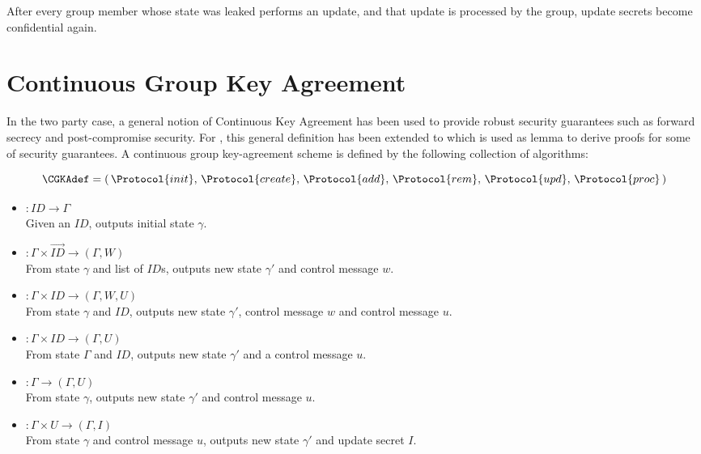\begin{definition}
After every group member whose state was leaked performs an update, and that update is processed by the group, update secrets become confidential again.
\end{definition}


\hypertarget{sec:CGKA}{%
\section{Continuous Group Key Agreement}\label{sec:CGKA}}

In the two party case, a general notion of Continuous Key Agreement \autocite{alwen2019double} has been used to provide robust security guarantees such as forward secrecy and post-compromise security.
For , this general definition has been extended to  \autocite{alwen2020security} which is used as lemma to derive proofs for some of  security guarantees.
A continuous group key-agreement scheme is defined by the following collection of algorithms:

\[ \CGKAdef = \left(\,\Protocol{init},\, \Protocol{create},\, \Protocol{add},\, \Protocol{rem},\, \Protocol{upd},\, \Protocol{proc}\,\right) \]

\begin{itemize}
\item {}   \(: ID \to \Gamma\)\\
  Given an \(ID\), outputs initial state \(\gamma\).
\item {} \(: \Gamma \times \overrightarrow{ID} \to (\Gamma, W)\)\\
  From state \(\gamma\) and list of \(ID\)s, outputs new state \(\gamma'\) and control message \(w\).
\item {}    \(: \Gamma \times ID \to (\Gamma, W, U)\)\\
  From state \(\gamma\) and \(ID\), outputs new state \(\gamma'\), control message \(w\) and control message \(u\).
\item {}    \(: \Gamma \times ID \to (\Gamma, U)\)\\
  From state \(\Gamma\) and \(ID\), outputs new state \(\gamma'\) and a control message \(u\).
\item {}    \(: \Gamma \to (\Gamma, U)\)\\
  From state \(\gamma\), outputs new state \(\gamma'\) and control message \(u\).
\item {}   \(: \Gamma \times U \to (\Gamma, I)\)\\
  From state \(\gamma\) and control message \(u\), outputs new state \(\gamma'\) and update secret \(I\).
\end{itemize}


